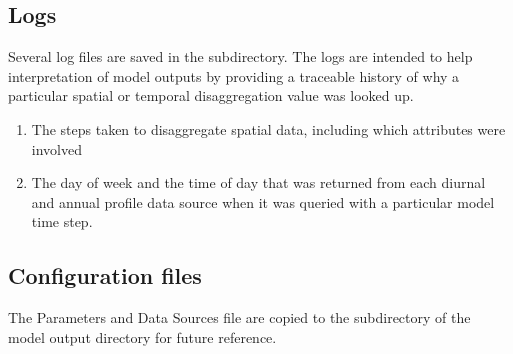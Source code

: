 \documentclass[letterpaper,10pt,english]{sphinxmanual}
\begin{document}
\subsection{Logs}
\label{\detokenize{OtherManuals/GQF_Manual:logs}}
Several log files are saved in the  subdirectory. The logs are
intended to help interpretation of model outputs by providing a
traceable history of why a particular spatial or temporal disaggregation
value was looked up.
\begin{enumerate}
\item {} 
The steps taken to disaggregate spatial data, including which
attributes were involved

\item {} 
The day of week and the time of day that was returned from each
diurnal and annual profile data source when it was queried with a
particular model time step.

\end{enumerate}


\subsection{Configuration files}
\label{\detokenize{OtherManuals/GQF_Manual:configuration-files}}
The Parameters and Data Sources file are copied to the 
subdirectory of the model output directory for future reference.
\end{document}
